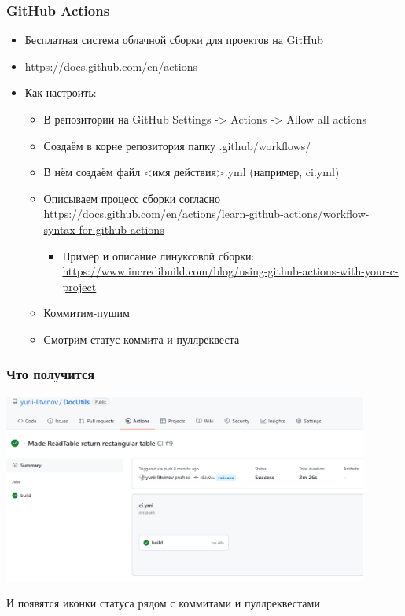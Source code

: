 \documentclass{../../slides-style}
\begin{document}
    \begin{frame}
        \frametitle{GitHub Actions}
        \begin{itemize}
            \item Бесплатная система облачной сборки для проектов на GitHub
            \item \url{https://docs.github.com/en/actions}
            \item Как настроить:
            \begin{itemize}
                \item В репозитории на GitHub Settings -> Actions -> Allow all actions
                \item Создаём в корне репозитория папку .github/workflows/
                \item В нём создаём файл <имя действия>.yml (например, ci.yml)
                \item Описываем процесс сборки согласно \url{https://docs.github.com/en/actions/learn-github-actions/workflow-syntax-for-github-actions}
                \begin{itemize}
                    \item Пример и описание линуксовой сборки: \url{https://www.incredibuild.com/blog/using-github-actions-with-your-c-project}
                \end{itemize}
                \item Коммитим-пушим
                \item Смотрим статус коммита и пуллреквеста
            \end{itemize}
        \end{itemize}
    \end{frame}

    \begin{frame}
        \frametitle{Что получится}
        \begin{center}
            \includegraphics[width=0.9\textwidth]{githubActionsBuildStatus}
        \end{center}
        И появятся иконки статуса рядом с коммитами и пуллреквестами
    \end{frame}
\end{document}
